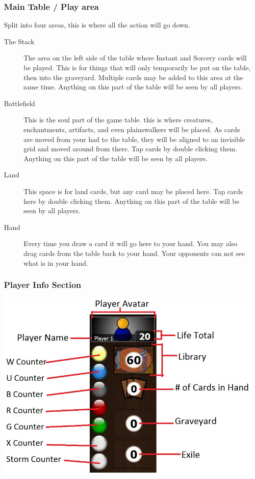\documentclass[a4paper]{scrbook}
\begin{document}
\subsubsection{Main Table / Play area}
Split into four areas, this is where all the action will go down.
\begin{description}
 \item[The Stack] The area on the left side of the table where Instant and Sorcery cards will be played. This is for things that will only temporarily be put on the table, then into the graveyard. Multiple cards may be added to this area at the same time. Anything on this part of the table will be seen by all players.
 \item[Battlefield] This is the soul part of the game table. this is where creatures, enchantments, artifacts, and even plainswalkers will be placed. As cards are moved from your had to the table, they will be aligned to an invisible grid and moved around from there. Tap cards by double clicking them. Anything on this part of the table will be seen by all players.
 \item[Land] This space is for land cards, but any card may be placed here. Tap cards here by double clicking them. Anything on this part of the table will be seen by all players.
 \item[Hand] Every time you draw a card it will go here to your hand. You may also drag cards from the table back to your hand. Your opponents can not see what is in your hand.
\end{description}

\subsubsection{Player Info Section}
\begin{center}
\includegraphics[scale=0.7]{pics/fetch0300}
\end{center}
\end{document}
